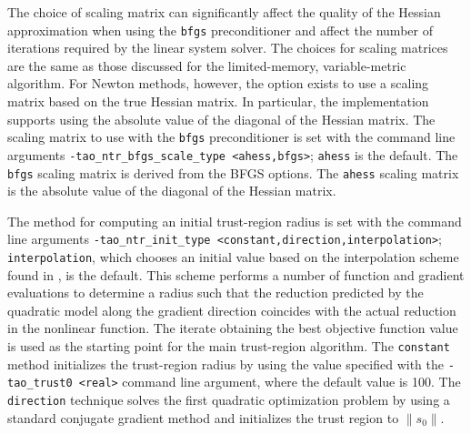 The choice of scaling matrix can significantly affect the quality 
of the Hessian approximation when using the {\tt bfgs} preconditioner and
affect the number of iterations required by the linear system solver.
The choices for scaling matrices are the same as those discussed for 
the limited-memory, variable-metric algorithm.  For Newton methods,
however, the option exists to use a scaling matrix based on the true
Hessian matrix.  In particular, the implementation supports using the 
absolute value of the diagonal of the Hessian matrix.  The scaling 
matrix to use with the {\tt bfgs} preconditioner is set with the 
command line arguments {\tt -tao\_ntr\_bfgs\_scale\_type <ahess,bfgs>}; 
{\tt ahess} is the default.  The {\tt bfgs} scaling matrix is derived from 
the BFGS options.  The {\tt ahess} scaling matrix is the absolute value of 
the diagonal of the Hessian matrix.

The method for computing an initial trust-region radius is set with the 
command line arguments {\tt -tao\_ntr\_init\_type <constant,direction,interpolation>};
{\tt interpolation}, which chooses an initial value based on the 
interpolation scheme found in \cite{CGT}, is the default.  This
scheme performs a number of function and gradient evaluations to determine 
a radius such that the reduction predicted by the quadratic model along the 
gradient direction coincides with the actual reduction in the nonlinear 
function.  The iterate obtaining the best objective function value is 
used as the starting point for the main trust-region algorithm.  The 
{\tt constant} method initializes the trust-region radius by using 
the value specified with the {\tt -tao\_trust0 <real>} command line 
argument, where the default value is 100.  The {\tt direction} technique 
solves the first quadratic optimization problem by using a standard 
conjugate gradient method and initializes the trust region to 
$\|s_0\|$.

